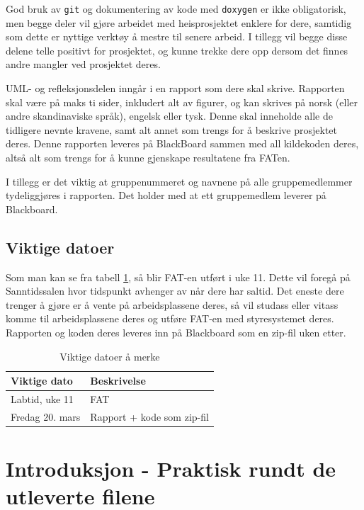 \begin{alphasection}
God bruk av \verb|git| og dokumentering av kode med \verb|doxygen| er ikke obligatorisk, men begge deler vil gjøre arbeidet med heisprosjektet enklere for dere, samtidig som dette er nyttige verktøy å mestre til senere arbeid. I tillegg vil begge disse delene telle positivt for prosjektet, og kunne trekke dere opp dersom det finnes andre mangler ved prosjektet deres.

UML- og refleksjonsdelen inngår i en rapport som dere skal skrive. Rapporten skal være på maks ti sider, inkludert alt av figurer, og kan skrives på norsk (eller andre skandinaviske språk), engelsk eller tysk. Denne skal inneholde alle de tidligere nevnte kravene, samt alt annet som trengs for å beskrive prosjektet deres. Denne rapporten leveres på BlackBoard sammen med all kildekoden deres, altså alt som trengs for å kunne gjenskape resultatene fra FATen.

I tillegg er det viktig at gruppenummeret og navnene på alle gruppemedlemmer tydeliggjøres i rapporten. Det holder med at ett gruppemedlem leverer på Blackboard.

\subsection*{Viktige datoer}
Som man kan se fra tabell \ref{tab:viktige-dato}, så blir FAT-en utført i uke 11. Dette vil foregå på Sanntidssalen hvor tidspunkt avhenger av når dere har saltid. Det eneste dere trenger å gjøre er å vente på arbeidsplassene deres, så vil studass eller vitass komme til arbeidsplassene deres og utføre FAT-en med styresystemet deres. Rapporten og koden deres leveres inn på Blackboard som en zip-fil uken etter.

\begin{table}[ht]
\centering
 \begin{tabular}{|p{4cm} p{5.5cm}|} 
 \hline
 Viktige dato & Beskrivelse \\ [0.5ex] 
 \hline\hline
  Labtid, uke 11 & FAT \\
 \hline
  Fredag 20. mars & Rapport + kode som zip-fil \\
 \hline
\end{tabular}
\caption{Viktige datoer å merke}
\label{tab:viktige-dato} 
\end{table}

\section{Introduksjon - Praktisk rundt de utleverte filene}


\end{alphasection}
